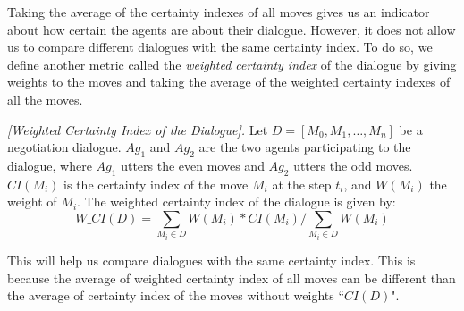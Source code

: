 Taking the average of the certainty indexes of all moves gives us an indicator about how certain the agents are about their
dialogue. However, it does not allow us to compare different dialogues with the same certainty index. To do so, we define
another metric called the \emph{weighted certainty index} of the dialogue by giving weights to the moves and taking the average of
the weighted certainty indexes of all the moves.

\begin{definition}{\emph{[Weighted Certainty Index of the Dialogue]. }}\label{WeightedCIDialogue}
Let $D =[M_0, M_1,\ldots,M_n]$ be a negotiation dialogue. $Ag_1$ and $Ag_2$ are the two agents participating
to the dialogue, where $Ag_1$ utters the even moves and $Ag_2$ utters the odd moves. $CI(M_i)$ is the certainty index
of the move $M_i$ at the step $t_i$, and $W(M_i)$ the weight of $M_i$. The weighted certainty index of the dialogue is given by:
\begin{equation}\label{equation13}
 W\_CI(D)=\sum_{M_i\in D}{W(M_i)*CI(M_i)}/\sum_{M_i\in D}W(M_i)
\end{equation}
\end{definition}
%
This will help us compare dialogues with the same certainty index. This is because the average of weighted certainty index of all
moves can be different than the average of certainty index of the moves without weights ``$CI(D)$".
%
